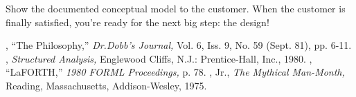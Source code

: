 Show the documented conceptual model to the customer. When the
customer is finally satisfied, you're ready for the next big step: the
design!%
%

\begin{references}{9}
 , ``The \Forth{} Philosophy,''
  \emph{Dr.\@ Dobb's Journal,} Vol. 6, Iss. 9, No. 59 (Sept. 81),
  pp. 6-11.
 , \emph{Structured Analysis,}
  Englewood Cliffs, N.J.: Prentice-Hall, Inc., 1980.
 , ``LaFORTH,''
  \emph{1980 FORML Proceedings,} p. 78.
 , Jr., \emph{The Mythical
  Man-Month,} Reading, Massachusetts, Addison-Wesley, 1975.
\end{references}


